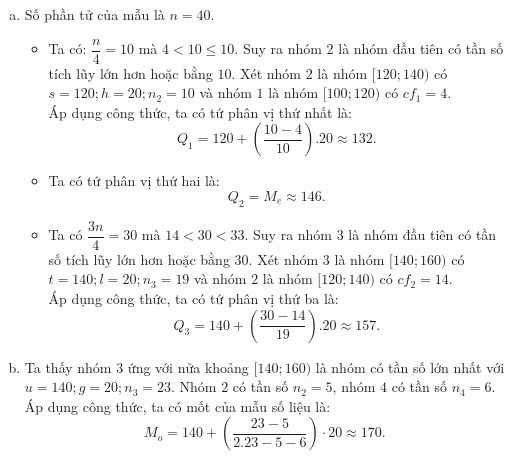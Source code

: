 \begin{bt}
{\begin{enumerate} [a)]
			mà $cf_2=14<20<cf_3=33$. Suy ra nhóm $3$ là nhóm đầu tiên có tần số tích lũy lớn hơn hoặc bằng $20$.\\
			Xét nhóm $3$ là nhóm $[140;160)$ có $r=140;d=20;n_3=19$ và nhóm $2$ là nhóm $[140;160)$ có $cf_2=14$.\\
			Áp dụng công thức, ta có trung vị của mẫu số liệu là:
			$$M_e=140+\left(\dfrac{20-14}{19}\right).20 \approx 146$$
			\item Số phần tử của mẫu là $n=40$.
			\begin{itemize} 
				\item Ta có: $\dfrac{n}{4}=10$ mà $4<10 \le 10$. Suy ra nhóm $2$ là nhóm đầu tiên có tần số tích lũy lớn hơn hoặc bằng $10$. Xét nhóm $2$ là nhóm $[120;140)$ có $s=120;h=20;n_2=10$ và nhóm $1$ là nhóm $[100;120)$ có $cf_1=4$.\\
				Áp dụng công thức, ta có tứ phân vị thứ nhất là:
				$$Q_1=120+\left(\dfrac{10-4}{10}\right).20 \approx 132.$$
				\item Ta có tứ phân vị thứ hai là: 
				$$Q_2=M_e \approx 146.$$
				\item Ta có $\dfrac{3n}{4}=30$ mà $14<30<33$. Suy ra nhóm $3$ là nhóm đầu tiên có tần số tích lũy lớn hơn hoặc bằng $30$. Xét nhóm $3$ là nhóm $[140;160)$ có $t=140;l=20;n_3=19$ và nhóm $2$ là nhóm $[120;140)$ có $cf_2=14$.\\
				Áp dụng công thức, ta có tứ phân vị thứ ba là:
				$$Q_3=140+\left(\dfrac{30-14}{19}\right).20 \approx 157.$$	
			\end{itemize}
			\item Ta thấy nhóm $3$ ứng với nửa khoảng $[140;160)$ là nhóm có tần số lớn nhất với $u=140;g=20;n_3=23$. Nhóm $2$ có tần số $n_2=5$, nhóm $4$ có tần số $n_4=6$.\\
			Áp dụng công thức, ta có mốt của mẫu số liệu là:
			$$ M_o=140+\left(\dfrac{23-5}{2.23-5-6}\right) \cdot 20 \approx 170.$$
		\end{enumerate}
	}
\end{bt}

